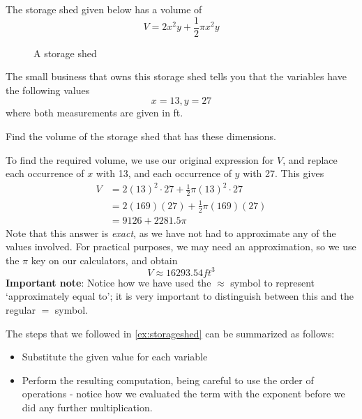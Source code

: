 \begin{myexample}\label{ex:storageshed}
The storage shed given below has a volume of
\[
	V= 2x^2y+ \frac{1}{2}\pi x^2 y
\]
\begin{figure}[!h]
	\centering
	\caption{A storage shed}
\end{figure}
\FloatBarrier
			
The small business that owns this storage shed tells you that the variables have the following 
values
\[
	x = 13, y = 27
\]
where both measurements are given in ft. 
			
Find the volume of the storage shed that has these
dimensions.
\end{myexample}
\begin{myProof}
	To find the required volume, we use our original expression for $V$, and replace each occurrence of $x$
	with 13, and each occurrence of $y$ with 27. This gives
	\begin{align*}
		V & =		2(13)^2\cdot 27 + \frac{1}{2}\pi (13)^2	\cdot 27 \\
		  & =		2(169)(27)+\frac{1}{2}\pi(169)(27)               \\
		  & =		9126+2281.5\pi                                   
	\end{align*} Note that this answer is {\em exact}, as we have not had to approximate any of the values
	involved. For practical purposes, we may need an approximation, so we use the $\pi$ key on our calculators,
	and obtain
	\[
		V \approx 16293.54 ft^3
	\]
	{\bfseries Important note}: Notice how we have used the $\approx$ symbol to represent
	`approximately equal to'; it is very important to distinguish between this and the regular $=$ symbol.
				
\end{myProof} 

The steps that we followed in \cref{ex:storageshed} can be summarized as follows:
\begin{itemize}
	\item Substitute the given value for each variable
	\item Perform the resulting computation, being careful to use the order of operations - notice how we evaluated
	the term with the exponent before we did any further multiplication.
\end{itemize} 

